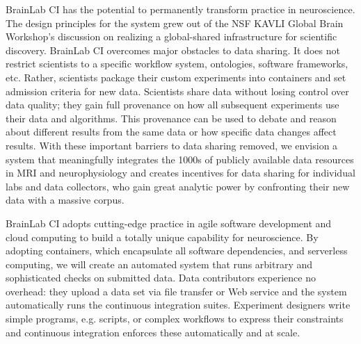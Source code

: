 %
BrainLab CI has the potential to permanently transform practice in neuroscience. The design principles for the system grew out of the NSF KAVLI Global Brain Workshop's discussion on realizing a global-shared infrastructure for scientific discovery. BrainLab CI overcomes major obstacles to data sharing. It does not restrict scientists to a specific workflow system, ontologies, software frameworks, etc. Rather, scientists package their custom experiments into containers and set admission criteria for new data. Scientists share data without losing control over data quality; they gain full provenance on how all subsequent experiments use their data and algorithms. This provenance can be used to debate and reason about different results from the same data or how specific data changes affect results. With these important barriers to data sharing removed, we envision a system that meaningfully integrates the 1000s of publicly available data resources in MRI and neurophysiology and creates incentives for data sharing for individual labs and data collectors, who gain great analytic power by confronting their new data with a massive corpus.

%
BrainLab CI adopts cutting-edge practice in agile software development and cloud computing to build a totally unique capability for neuroscience. By adopting containers, which encapsulate all software dependencies, and serverless computing, we will create an automated system that runs arbitrary and sophisticated checks on submitted data. Data contributors experience no overhead: they upload a data set via file transfer or Web service and the system automatically runs the continuous integration suites. Experiment designers write simple programs, e.g. scripts, or complex workflows to express their constraints and continuous integration enforces these automatically and at scale.

\vspace{-3pt}

